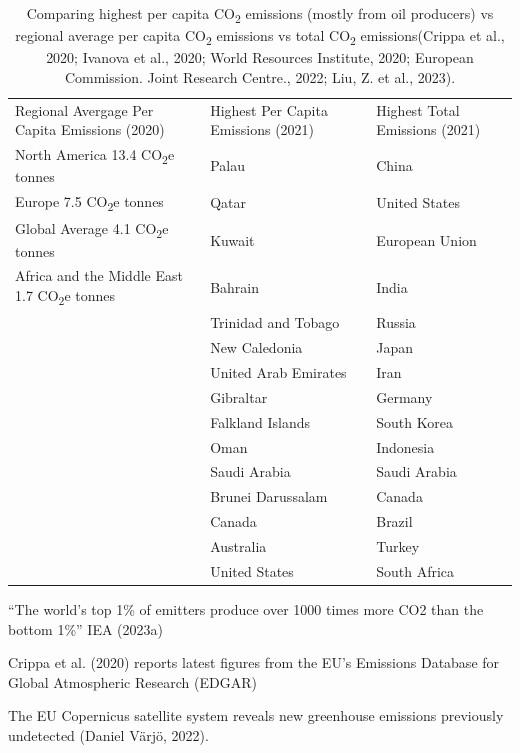 \documentclass[
  letterpaper,
  DIV=11,
  numbers=noendperiod]{scrartcl}
\begin{document}
\begin{longtable}[]{@{}
  >{\raggedright\arraybackslash}p{}
  >{\raggedright\arraybackslash}p{}
  >{\raggedright\arraybackslash}p{}@{}}
\caption{Comparing highest per capita CO\textsubscript{2} emissions
(mostly from oil producers) vs regional average per capita
CO\textsubscript{2} emissions vs total CO\textsubscript{2}
emissions(Crippa et al., 2020; Ivanova et al., 2020; World Resources
Institute, 2020; European Commission. Joint Research Centre., 2022; Liu,
Z. et al., 2023).}\tabularnewline
\toprule\noalign{}
\endfirsthead
\endhead
\bottomrule\noalign{}
\endlastfoot
Regional Avergage Per Capita Emissions (2020) & Highest Per Capita
Emissions (2021) & Highest Total Emissions (2021) \\
North America 13.4 CO\textsubscript{2}e tonnes & Palau & China \\
Europe 7.5 CO\textsubscript{2}e tonnes & Qatar & United States \\
Global Average 4.1 CO\textsubscript{2}e tonnes & Kuwait & European
Union \\
Africa and the Middle East 1.7 CO\textsubscript{2}e tonnes & Bahrain &
India \\
& Trinidad and Tobago & Russia \\
& New Caledonia & Japan \\
& United Arab Emirates & Iran \\
& Gibraltar & Germany \\
& Falkland Islands & South Korea \\
& Oman & Indonesia \\
& Saudi Arabia & Saudi Arabia \\
& Brunei Darussalam & Canada \\
& Canada & Brazil \\
& Australia & Turkey \\
& United States & South Africa \\
\end{longtable}

``The world's top 1\% of emitters produce over 1000 times more CO2 than
the bottom 1\%'' IEA (2023a)

Crippa et al. (2020) reports latest figures from the EU's Emissions
Database for Global Atmospheric Research (EDGAR)

The EU Copernicus satellite system reveals new greenhouse emissions
previously undetected (Daniel Värjö, 2022).
\end{document}
